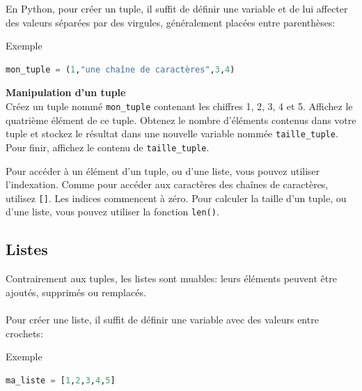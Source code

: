     En Python, pour créer un tuple, il suffit de définir une variable et de lui affecter des valeurs séparées par des virgules, généralement placées entre parenthèses:
    \begin{Example}{\faTerminal \quad Exemple}
        \begin{lstlisting}[language=Python]
mon_tuple = (1,"une chaîne de caractères",3,4)   \end{lstlisting}

    \end{Example}

    \begin{Exercice}[5 minutes] [Python] \textbf{Manipulation d'un tuple}\\
        Créez un tuple nommé \lstinline{mon_tuple} contenant les chiffres 1, 2, 3, 4 et 5. Affichez le quatrième élément de ce tuple. Obtenez le nombre d'éléments contenus dans votre tuple et stockez le résultat dans une nouvelle variable nommée \lstinline{taille_tuple}. Pour finir, affichez le contenu de \lstinline{taille_tuple}.
    
        \begin{conseil}
            Pour accéder à un élément d'un tuple, ou d'une liste, vous pouvez utiliser l'indexation. Comme pour accéder aux caractères des chaînes de caractères, utilisez \lstinline{[]}. Les indices commencent à zéro. Pour calculer la taille d'un tuple, ou d'une liste, vous pouvez utiliser la fonction \lstinline{len()}.
        \end{conseil}
        
        \begin{solution}
            
        \end{solution}
    \end{Exercice}
    
    \subsection{Listes}
    Contrairement aux tuples, les listes sont muables: leurs éléments peuvent être ajoutés, supprimés ou remplacés.
    \\ \\
    Pour créer une liste, il suffit de définir une variable avec des valeurs entre crochets:
    \begin{Example}{\faTerminal \quad Exemple}
        \begin{lstlisting}[language=Python]
ma_liste = [1,2,3,4,5]   \end{lstlisting}
    \end{Example}
    
